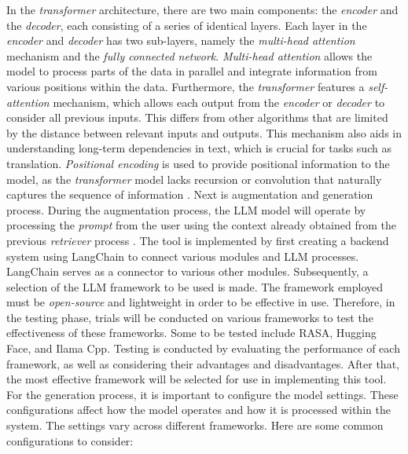 In the \emph{transformer} architecture, there are two main components: the \emph{encoder} and the \emph{decoder}, each consisting of a series of identical layers. Each layer in the \emph{encoder} and \emph{decoder} has two sub-layers, namely the \emph{multi-head attention} mechanism and the \emph{fully connected network}. \emph{Multi-head attention} allows the model to process parts of the data in parallel and integrate information from various positions within the data. Furthermore, the \emph{transformer} features a \emph{self-attention} mechanism, which allows each output from the \emph{encoder} or \emph{decoder} to consider all previous inputs. This differs from other algorithms that are limited by the distance between relevant inputs and outputs. This mechanism also aids in understanding long-term dependencies in text, which is crucial for tasks such as translation. \emph{Positional encoding} is used to provide positional information to the model, as the \emph{transformer} model lacks recursion or convolution that naturally captures the sequence of information \cite{vaswani2017attention}.
Next is augmentation and generation process. During the augmentation process, the LLM model will operate by processing the \emph{prompt} from the user using the context already obtained from the previous \emph{retriever} process \cite{bansal2024llm}. The tool is implemented by first creating a backend system using LangChain to connect various modules and LLM processes. LangChain serves as a connector to various other modules. Subsequently, a selection of the LLM framework to be used is made. The framework employed must be \emph{open-source} and lightweight in order to be effective in use. Therefore, in the testing phase, trials will be conducted on various frameworks to test the effectiveness of these frameworks. Some to be tested include RASA, Hugging Face, and Ilama Cpp. Testing is conducted by evaluating the performance of each framework, as well as considering their advantages and disadvantages. After that, the most effective framework will be selected for use in implementing this tool. For the generation process, it is important to configure the model settings. These configurations affect how the model operates and how it is processed within the system. The settings vary across different frameworks. Here are some common configurations to consider:

